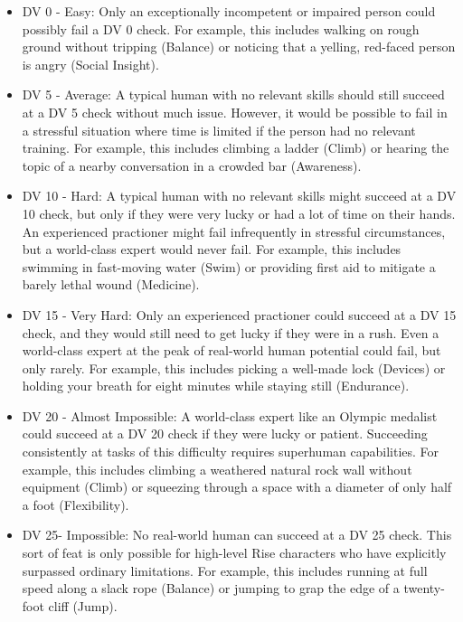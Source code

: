         \begin{itemize}
            \item DV 0 - Easy: Only an exceptionally incompetent or impaired person could possibly fail a DV 0 check. For example, this includes walking on rough ground without tripping (Balance) or noticing that a yelling, red-faced person is angry (Social Insight).
            \item DV 5 - Average: A typical human with no relevant skills should still succeed at a DV 5 check without much issue. However, it would be possible to fail in a stressful situation where time is limited if the person had no relevant training. For example, this includes climbing a ladder (Climb) or hearing the topic of a nearby conversation in a crowded bar (Awareness).
            \item DV 10 - Hard: A typical human with no relevant skills might succeed at a DV 10 check, but only if they were very lucky or had a lot of time on their hands. An experienced practioner might fail infrequently in stressful circumstances, but a world-class expert would never fail. For example, this includes swimming in fast-moving water (Swim) or providing first aid to mitigate a barely lethal wound (Medicine).
            \item DV 15 - Very Hard: Only an experienced practioner could succeed at a DV 15 check, and they would still need to get lucky if they were in a rush. Even a world-class expert at the peak of real-world human potential could fail, but only rarely. For example, this includes picking a well-made lock (Devices) or holding your breath for eight minutes while staying still (Endurance).
            \item DV 20 - Almost Impossible: A world-class expert like an Olympic medalist could succeed at a DV 20 check if they were lucky or patient. Succeeding consistently at tasks of this difficulty requires superhuman capabilities. For example, this includes climbing a weathered natural rock wall without equipment (Climb) or squeezing through a space with a diameter of only half a foot (Flexibility).
            \item DV 25\add - Impossible: No real-world human can succeed at a DV 25 check. This sort of feat is only possible for high-level Rise characters who have explicitly surpassed ordinary limitations. For example, this includes running at full speed along a slack rope (Balance) or jumping to grap the edge of a twenty-foot cliff (Jump).
        \end{itemize}

